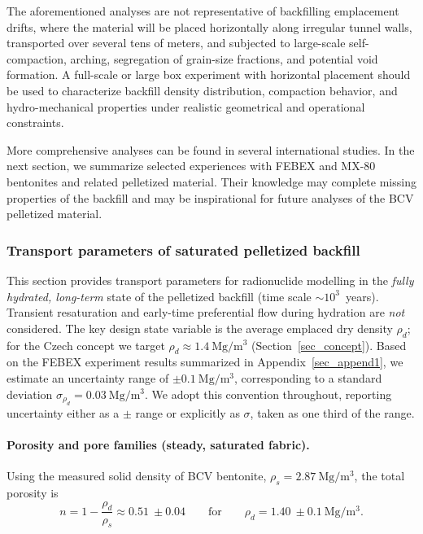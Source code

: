 The aforementioned analyses are not representative of backfilling emplacement
drifts, where the material will be placed horizontally along irregular tunnel
walls, transported over several tens of meters, and subjected to large-scale
self-compaction, arching, segregation of grain-size fractions, and potential
void formation. A full-scale or large box experiment with horizontal placement
should be used to characterize backfill density distribution, compaction
behavior, and hydro-mechanical properties under realistic geometrical and
operational constraints.

More comprehensive analyses can be found in several international studies. In
the next section, we summarize selected experiences with FEBEX and MX-80
bentonites and related pelletized material. Their knowledge may complete
missing properties of the backfill and may be inspirational for future analyses
of the \acrshort{BCV} pelletized material.

\subsubsection{Transport parameters of saturated pelletized backfill}
\label{sec:transport_pellets}
\label{sec_concept}

This section provides transport parameters for radionuclide modelling in the
\emph{fully hydrated, long-term} state of the pelletized backfill (time scale
$\sim 10^3$~years). Transient resaturation and early-time preferential flow
during hydration are \emph{not} considered. The key design state variable is
the average emplaced dry density $\rho_d$; for the Czech concept we target
$\rho_d \approx 1.4~\mathrm{Mg/m^3}$ (Section~\ref{sec_concept}). Based on the
FEBEX experiment results summarized in Appendix~\ref{sec_append1}, we estimate
an uncertainty range of $\pm 0.1~\mathrm{Mg/m^3}$, corresponding to a standard
deviation $\sigma_{\rho_d}=0.03~\mathrm{Mg/m^3}$. We adopt this convention
throughout, reporting uncertainty either as a
$\pm$ range or explicitly as $\sigma$, taken as one third of the range.

\paragraph{Porosity and pore families (steady, saturated fabric).}
Using the measured solid density of BCV bentonite,
$\rho_s=2.87~\mathrm{Mg/m^3}$, the total porosity is
\[
n = 1-\frac{\rho_d}{\rho_s}\approx 0.51~\pm 0.04 \qquad \text{for}\qquad \rho_d=1.40~\pm 0.1~\mathrm{Mg/m^3}.
\]

